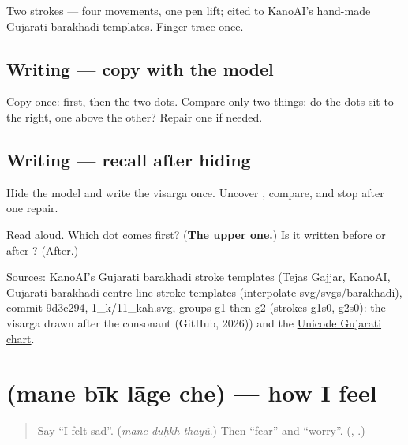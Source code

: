 Two strokes — four movements, one pen lift; cited to KanoAI's hand-made Gujarati barakhadi templates. Finger-trace \textbf{} once.

\subsection*{Writing — copy with the model}
Copy \textbf{} once: \textbf{} first, then the two dots. Compare only two things: do the dots sit to the right, one above the other? Repair one if needed.

\subsection*{Writing — recall after hiding}
Hide the model and write the visarga once. Uncover \textbf{}, compare, and stop after one repair.

\begin{tcolorbox}[breakable,colback=teal!4,colframe=teal!35!black,title={Before you move on}]
Read \textbf{} aloud. Which dot comes first? (\textbf{The upper one.}) Is it written before or after \textbf{}? (After.)

Sources: \href{https://github.com/gajjartejas/KanoAI/tree/9d3e2949a3f265448e430e15329093ea3aa516b8/interpolate-svg/svgs/barakhadi}{KanoAI's Gujarati barakhadi stroke templates} (Tejas Gajjar, KanoAI, Gujarati barakhadi centre-line stroke templates (interpolate-svg/svgs/barakhadi), commit 9d3e294, 1\_k/11\_kah.svg, groups g1 then g2 (strokes g1s0, g2s0): the visarga drawn after the consonant (GitHub, 2026)) and the \href{https://www.unicode.org/charts/PDF/U0A80.pdf}{Unicode Gujarati chart}.
\end{tcolorbox}
\section[\texorpdfstring{\gu{મને} \gu{બીક} \gu{લાગે} \gu{છે} (mane bīk lāge che)}{મને બીક લાગે છે (mane bīk lāge che)}]{    (mane bīk lāge che) — how I feel}

\label{lesson:GU-C281-mane-bik}



\begin{quote}
Say \textquotedblleft{}I felt sad\textquotedblright{}. (\emph{mane duḥkh thayũ}.) Then \textquotedblleft{}fear\textquotedblright{} and \textquotedblleft{}worry\textquotedblright{}. (\textbf{}, \textbf{}.)
\end{quote}

